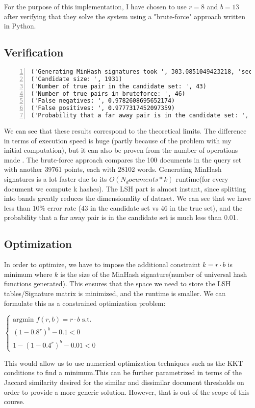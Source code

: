 For the purpose of this implementation, I have chosen to use $r=8$ and $b=13$ after verifying that they solve the system using a  "brute-force" approach written in Python.

\subsection{Verification}
\begin{lstlisting}[language={},numbers=left,numberstyle=\tiny,frame=single,breaklines=true,postbreak=\mbox{\textcolor{red}{$\hookrightarrow$}\space}]
('Generating MinHash signatures took ', 303.0851049423218, 'sec')
('Candidate size: ', 1931)
('Number of true pair in the candidate set: ', 43)
('Number of true pairs in bruteforce: ', 46)
('False negatives: ', 0.9782608695652174)
('False positives: ', 0.9777317452097359)
('Probability that a far away pair is in the candidate set: ', 0.0008969085829825304)
\end{lstlisting}

We can see that these results correspond to the theoretical limits. The difference in terms of execution speed is huge (partly because of the problem with my initial computation), but it can also be proven from the number of operations made . 
The brute-force approach compares the 100 documents in the query set with another 39761 points, each with 28102 words. Generating MinHash signatures is a lot faster due to its $O(N_documents*k)$ runtime(for every document we compute k hashes).
The LSH part is almost instant, since splitting into bands greatly reduces the dimensionality of dataset.
We can see that we have less than 10\% error rate (43 in the candidate set vs 46 in the true set), and the probability that a far away pair is in the candidate set is much less than 0.01.

\subsection{Optimization}
In order to optimize, we have to impose the additional constraint $k=r \cdot b$ is minimum where $k$ is the size of the MinHash signature(number of universal hash functions generated). This ensures that the space we need to store the LSH tables/Signature matrix is minimized, and the runtime is smaller. We can formulate this as a constrained optimization problem:

$\begin{cases}
\text{argmin } f(r,b) = r \cdot b \text{ s.t.}\\
(1-0.8^r)^b - 0.1< 0\\
1 - (1-0.4^r)^b - 0.01 < 0
\end{cases}$

This would allow us to use numerical optimization techniques such as the KKT conditions to find a minimum.This can be further parametrized in terms of the Jaccard similarity desired for the similar and dissimilar document thresholds on order to provide a more generic solution. However, that is out of the scope of this course.

